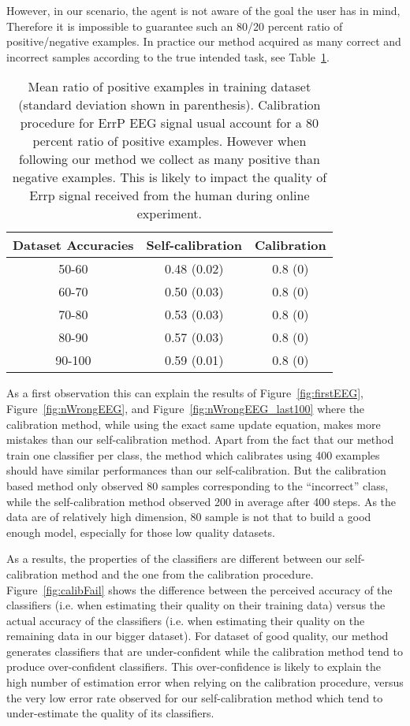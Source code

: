 However, in our scenario, the agent is not aware of the goal the user has in mind, Therefore it is impossible to guarantee such an 80/20 percent ratio of positive/negative examples. In practice our method acquired as many correct and incorrect samples according to the true intended task, see Table~\ref{tab:correctLabelRatio}.

\begin{table}
\centering
{}
\begin{tabular}{c c c}
Dataset Accuracies & Self-calibration & Calibration \\ \hline
50-60 & 0.48 (0.02) & 0.8 (0) \\
60-70 & 0.50 (0.03) & 0.8 (0) \\
70-80 & 0.53 (0.03) & 0.8 (0) \\
80-90 & 0.57 (0.03) & 0.8 (0) \\
90-100 & 0.59 (0.01) & 0.8 (0) \\
\end{tabular}
\caption{Mean ratio of positive examples in training dataset (standard deviation shown in parenthesis). Calibration procedure for ErrP EEG signal usual account for a 80 percent ratio of positive examples. However when following our method we collect as many positive than negative examples. This is likely to impact the quality of Errp signal received from the human during online experiment.}
\label{tab:correctLabelRatio}
\end{table}

As a first observation this can explain the results of Figure~\ref{fig:firstEEG}, Figure~\ref{fig:nWrongEEG}, and Figure~\ref{fig:nWrongEEG_last100} where the calibration method, while using the exact same update equation, makes more mistakes than our self-calibration method. Apart from the fact that our method train one classifier per class, the method which calibrates using 400 examples should have similar performances than our self-calibration. But the calibration based method only observed 80 samples corresponding to the ``incorrect'' class, while the self-calibration method observed 200 in average after 400 steps. As the data are of relatively high dimension, 80 sample is not that to build a good enough model, especially for those low quality datasets.

As a results, the properties of the classifiers are different between our self-calibration method and the one from the calibration procedure. Figure~\ref{fig:calibFail} shows the difference between the perceived accuracy of the classifiers (i.e. when estimating their quality on their training data) versus the actual accuracy of the classifiers (i.e. when estimating their quality on the remaining data in our bigger dataset). For dataset of good quality, our method generates classifiers that are under-confident while the calibration method tend to produce over-confident classifiers. This over-confidence is likely to explain the high number of estimation error when relying on the  calibration procedure, versus the very low error rate observed for our self-calibration method which tend to under-estimate the quality of its classifiers.

